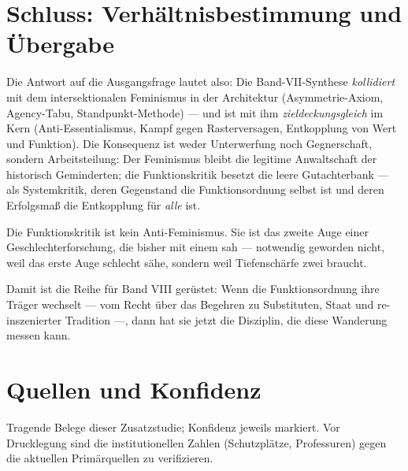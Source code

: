 \section{Schluss: Verhältnisbestimmung und Übergabe}

Die Antwort auf die Ausgangsfrage lautet also: Die Band-VII-Synthese
\emph{kollidiert} mit dem intersektionalen Feminismus in der Architektur
(Asymmetrie-Axiom, Agency-Tabu, Standpunkt-Methode) --- und ist mit ihm
\emph{zieldeckungsgleich} im Kern (Anti-Essentialismus, Kampf gegen
Rasterversagen, Entkopplung von Wert und Funktion). Die Konsequenz ist weder
Unterwerfung noch Gegnerschaft, sondern Arbeitsteilung: Der Feminismus bleibt
die legitime Anwaltschaft der historisch Geminderten; die Funktionskritik
besetzt die leere Gutachterbank --- als Systemkritik, deren Gegenstand die
Funktionsordnung selbst ist und deren Erfolgsmaß die Entkopplung für
\emph{alle} ist.

\begin{merksatz}
Die Funktionskritik ist kein Anti-Feminismus. Sie ist das zweite Auge einer
Geschlechterforschung, die bisher mit einem sah --- notwendig geworden nicht,
weil das erste Auge schlecht sähe, sondern weil Tiefenschärfe zwei braucht.
\end{merksatz}

Damit ist die Reihe für Band VIII gerüstet: Wenn die Funktionsordnung ihre
Träger wechselt --- vom Recht über das Begehren zu Substituten, Staat und
re-inszenierter Tradition ---, dann hat sie jetzt die Disziplin, die diese
Wanderung messen kann.

\section*{Quellen und Konfidenz}
\small
Tragende Belege dieser Zusatzstudie; Konfidenz jeweils markiert. Vor
Drucklegung sind die institutionellen Zahlen (Schutzplätze, Professuren) gegen
die aktuellen Primärquellen zu verifizieren.

